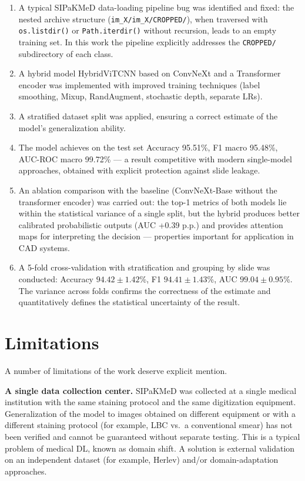 \documentclass[14pt,a4paper]{extreport}
\begin{document}
\begin{enumerate}
    \item A typical SIPaKMeD data-loading pipeline bug was identified and
          fixed: the nested archive structure
          (\texttt{im\_X/im\_X/CROPPED/}), when traversed with
          \texttt{os.listdir()} or \texttt{Path.iterdir()} without
          recursion, leads to an empty training set. In this work the
          pipeline explicitly addresses the \texttt{CROPPED/}
          subdirectory of each class.
    \item A hybrid model HybridViTCNN based on ConvNeXt and a
          Transformer encoder was implemented with improved training
          techniques (label smoothing, Mixup, RandAugment, stochastic
          depth, separate LRs).
    \item A stratified dataset split was applied, ensuring a correct
          estimate of the model's generalization ability.
    \item The model achieves on the test set Accuracy 95.51\%, F1 macro
          95.48\%, AUC-ROC macro 99.72\% --- a result competitive with
          modern single-model approaches, obtained with explicit
          protection against slide leakage.
    \item An ablation comparison with the baseline (ConvNeXt-Base
          without the transformer encoder) was carried out: the top-1
          metrics of both models lie within the statistical variance of
          a single split, but the hybrid produces better calibrated
          probabilistic outputs (AUC +0.39 p.p.) and provides attention
          maps for interpreting the decision --- properties important
          for application in CAD systems.
    \item A 5-fold cross-validation with stratification and grouping by
          slide was conducted: Accuracy $94.42 \pm 1.42$\%, F1 $94.41
          \pm 1.43$\%, AUC $99.04 \pm 0.95$\%. The variance across folds
          confirms the correctness of the estimate and quantitatively
          defines the statistical uncertainty of the result.
\end{enumerate}

\section{Limitations}

A number of limitations of the work deserve explicit mention.

\textbf{A single data collection center.} SIPaKMeD was collected at a
single medical institution with the same staining protocol and the same
digitization equipment. Generalization of the model to images obtained
on different equipment or with a different staining protocol (for
example, LBC vs.\ a conventional smear) has not been verified and cannot
be guaranteed without separate testing. This is a typical problem of
medical DL, known as domain shift. A solution is external validation on
an independent dataset (for example, Herlev) and/or domain-adaptation
approaches.
\end{document}
